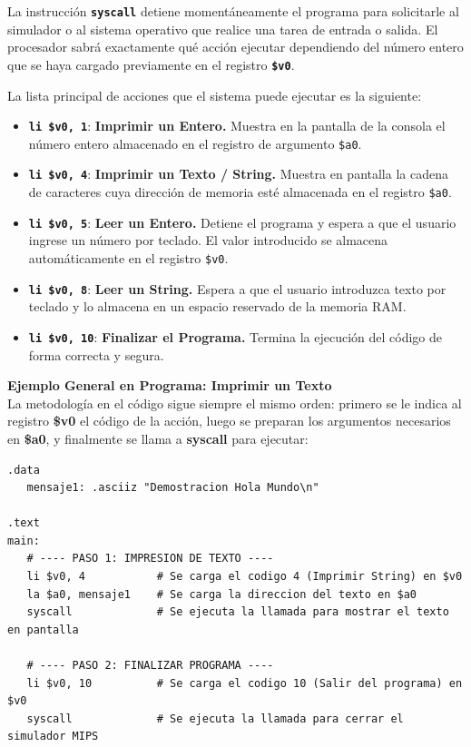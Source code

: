 \documentclass[12pt,a4paper]{article}
\begin{document}
\begin{tcolorbox}[colback=colorSyscall!5, colframe=colorSyscall, title=Funciones del Sistema (Input y Consola), fonttitle=\bfseries]
La instrucción \textbf{\texttt{syscall}} detiene momentáneamente el programa para solicitarle al simulador o al sistema operativo que realice una tarea de entrada o salida. El procesador sabrá exactamente qué acción ejecutar dependiendo del número entero que se haya cargado previamente en el registro \textbf{\texttt{\$v0}}.

La lista principal de acciones que el sistema puede ejecutar es la siguiente:
\begin{itemize}
    \item \textbf{\texttt{li \$v0, 1}}: \textbf{Imprimir un Entero.} Muestra en la pantalla de la consola el número entero almacenado en el registro de argumento \texttt{\$a0}.
    \item \textbf{\texttt{li \$v0, 4}}: \textbf{Imprimir un Texto / String.} Muestra en pantalla la cadena de caracteres cuya dirección de memoria esté almacenada en el registro \texttt{\$a0}.
    \item \textbf{\texttt{li \$v0, 5}}: \textbf{Leer un Entero.} Detiene el programa y espera a que el usuario ingrese un número por teclado. El valor introducido se almacena automáticamente en el registro \texttt{\$v0}.
    \item \textbf{\texttt{li \$v0, 8}}: \textbf{Leer un String.} Espera a que el usuario introduzca texto por teclado y lo almacena en un espacio reservado de la memoria RAM.
    \item \textbf{\texttt{li \$v0, 10}}: \textbf{Finalizar el Programa.} Termina la ejecución del código de forma correcta y segura.
\end{itemize}

\textbf{Ejemplo General en Programa: Imprimir un Texto} \\
La metodología en el código sigue siempre el mismo orden: primero se le indica al registro \textbf{\$v0} el código de la acción, luego se preparan los argumentos necesarios en \textbf{\$a0}, y finalmente se llama a \textbf{syscall} para ejecutar:

\begin{lstlisting}[numbers=none]
.data
   mensaje1: .asciiz "Demostracion Hola Mundo\n"

.text
main:
   # ---- PASO 1: IMPRESION DE TEXTO ----
   li $v0, 4           # Se carga el codigo 4 (Imprimir String) en $v0
   la $a0, mensaje1    # Se carga la direccion del texto en $a0
   syscall             # Se ejecuta la llamada para mostrar el texto en pantalla

   # ---- PASO 2: FINALIZAR PROGRAMA ----
   li $v0, 10          # Se carga el codigo 10 (Salir del programa) en $v0
   syscall             # Se ejecuta la llamada para cerrar el simulador MIPS
\end{lstlisting}
\end{tcolorbox}
\end{document}
